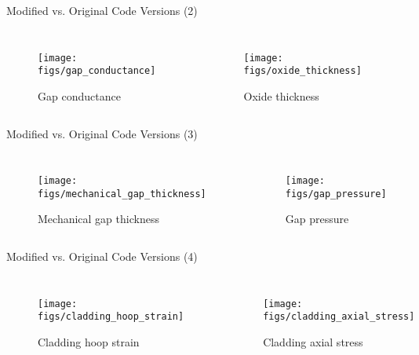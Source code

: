 \documentclass[11pt]{beamer}
\begin{document}
\begin{frame}{Modified vs. Original Code Versions (2)}
  \footnotesize 
  
  \begin{columns}[t]


  \begin{figure}[h]
    \texttt{[image: figs/gap\_conductance]}
    \caption{Gap conductance}
    \label{fig:conduct}    
  \end{figure}  


  \begin{figure}[h]
    \texttt{[image: figs/oxide\_thickness]}    
    \caption{Oxide thickness}
    \label{fig:oxide}
  \end{figure}  
  
  \end{columns}

\end{frame}


\begin{frame}{Modified vs. Original Code Versions (3)}
  \footnotesize 
  
  \begin{columns}[t]


  \begin{figure}[h]
    \texttt{[image: figs/mechanical\_gap\_thickness]}
    \caption{Mechanical gap thickness}
  \end{figure}  


  \begin{figure}[h]
    \texttt{[image: figs/gap\_pressure]}    
    \caption{Gap pressure}
  \end{figure}  
  
  \end{columns}

\end{frame}

\begin{frame}{Modified vs. Original Code Versions (4)}
  \footnotesize 
  
  \begin{columns}[t]


  \begin{figure}[h]
    \texttt{[image: figs/cladding\_hoop\_strain]}
    \caption{Cladding hoop strain}
  \end{figure}  


  \begin{figure}[h]
    \texttt{[image: figs/cladding\_axial\_stress]}    
    \caption{Cladding axial stress}
  \end{figure}  
  
  \end{columns}

\end{frame}
\end{document}
